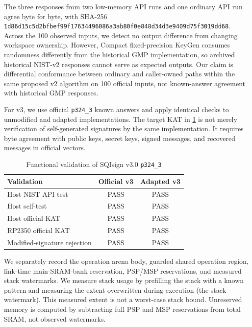 \documentclass[a4paper,10pt]{article}
\theoremstyle{definition}
\theoremstyle{remark}
\begin{document}
The three responses from two low-memory API runs and one ordinary API run agree byte for byte, with SHA-256 \texttt{1d86d15c5d2bfbef99f17634496086a3ab80f0e848d34d3e9409d75f3019dd68}. Across the 100 observed inputs, we detect no output difference from changing workspace ownership. However, Compact fixed-precision KeyGen consumes randomness differently from the historical GMP implementation, so archived historical NIST-v2 responses cannot serve as expected outputs. Our claim is differential conformance between ordinary and caller-owned paths within the same proposed v2 algorithm on 100 official inputs, not known-answer agreement with historical GMP responses.

For v3, we use official \texttt{p324\_3} known answers and apply identical checks to unmodified and adapted implementations. The target KAT in \cref{tab:v3-correctness-gates} is not merely verification of self-generated signatures by the same implementation. It requires byte agreement with public keys, secret keys, signed messages, and recovered messages in official vectors.

\begin{table}[H]
  \centering
  \caption{Functional validation of SQIsign v3.0 \texttt{p324\_3}}
  \label{tab:v3-correctness-gates}
  \small
  \begin{tabularx}{\linewidth}{@{}Xcc@{}}
    \toprule
    Validation & Official v3 & Adapted v3 \\
    \midrule
    Host NIST API test & PASS & PASS \\
    Host self-test & PASS & PASS \\
    Host official KAT & PASS & PASS \\
    RP2350 official KAT & PASS & PASS \\
    Modified-signature rejection & PASS & PASS \\
    \bottomrule
  \end{tabularx}
\end{table}

We separately record the operation arena body, guarded shared operation region, link-time main-SRAM-bank reservation, PSP/MSP reservations, and measured stack watermarks. We measure stack usage by prefilling the stack with a known pattern and measuring the extent overwritten during execution (the stack watermark). This measured extent is not a worst-case stack bound. Unreserved memory is computed by subtracting full PSP and MSP reservations from total SRAM, not observed watermarks.
\end{document}
